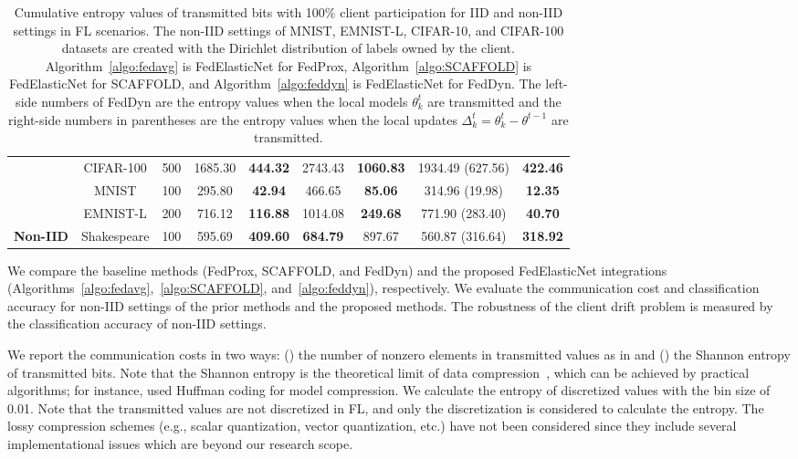 \documentclass{article} %
\begin{document}
\begin{table}[ht!]
{\begin{tabular}{|c|c|c|cc|cc|cc|}
\multicolumn{1}{|c|}{} &
  CIFAR-100 &
  500 &
  1685.30 &
  \textbf{444.32} &
  2743.43 &
  \textbf{1060.83} &
  1934.49 (627.56) &
  \textbf{422.46} \\ \cline{2-2}
\multicolumn{1}{|c|}{} &
  MNIST &
  100 &
  295.80 &
  \textbf{42.94} &
  466.65 &
  \textbf{85.06} &
  314.96 (19.98) &
  \textbf{12.35} \\ \cline{2-2}
\multicolumn{1}{|c|}{} &
  EMNIST-L &
  200 &
  716.12 &
  \textbf{116.88} &
  1014.08 &
  \textbf{249.68} &
  771.90 (283.40) &
  \textbf{40.70} \\ \hline
\multicolumn{1}{|c|}{\textbf{Non-IID}} &
  Shakespeare &
  100 &
  595.69 &
  \textbf{409.60} &
  \textbf{684.79} &
  {897.67} &
  560.87 (316.64) &
  \textbf{318.92} \\ \hline
\end{tabular}%
}
\caption{Cumulative entropy values of transmitted bits with 100$\%$ client participation for IID and non-IID settings in FL scenarios. The non-IID settings of MNIST, EMNIST-L, CIFAR-10, and CIFAR-100 datasets are created with the Dirichlet distribution of labels owned by the client. Algorithm~\ref{algo:fedavg} is FedElasticNet for FedProx, Algorithm~\ref{algo:SCAFFOLD} is FedElasticNet for SCAFFOLD, and Algorithm~\ref{algo:feddyn} is FedElasticNet for FedDyn. The left-side numbers of FedDyn are the entropy values when the local models $\theta_k^t$ are transmitted and the right-side numbers in parentheses are the entropy values when the local updates $\Delta_k^t = \theta_k^t - \theta^{t-1}$ are transmitted. }
\label{tab:100entropy}
\end{table}

We compare the baseline methods (FedProx, SCAFFOLD, and FedDyn) and the proposed FedElasticNet integrations (Algorithms~\ref{algo:fedavg},~\ref{algo:SCAFFOLD}, and~\ref{algo:feddyn}), respectively. We evaluate the communication cost and classification accuracy for non-IID settings of the prior methods and the proposed methods. The robustness of the client drift problem is measured by the classification accuracy of non-IID settings. 

We report the communication costs in two ways: ({}) the number of nonzero elements in transmitted values as in \citep{Yoon2021federated,Jeong2021federated} and ({}) the Shannon entropy of transmitted bits. Note that the Shannon entropy is the theoretical limit of data compression~\citep{Cover2006elements}, which can be achieved by practical algorithms; for instance, \citet{Han2016deep} used Huffman coding for model compression. We calculate the entropy of discretized values with the bin size of 0.01. Note that the transmitted values are not discretized in FL, and only the discretization is considered to calculate the entropy. The lossy compression schemes (e.g., scalar quantization, vector quantization, etc.) have not been considered since they include several implementational issues which are beyond our research scope. 
\end{document}

